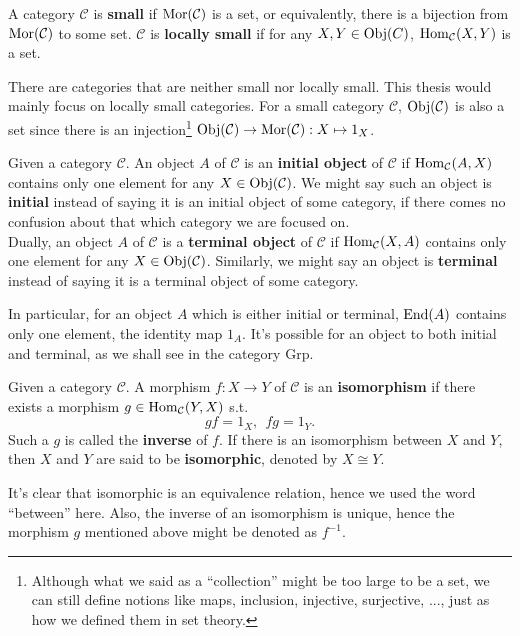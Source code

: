 	\begin{definition}
	A category $\mathcal{C}$ is \textbf{small} if $\operatorname{Mor}(\mathcal{C})$ is a set, or equivalently, there is a bijection from $\operatorname{Mor}(\mathcal{C})$ to some set. $\mathcal{C}$ is \textbf{locally small} if for any $X,Y\in \operatorname{Obj}(C)$, $\operatorname{Hom}_\mathcal{C}(X,Y)$ is a set.
	\end{definition}
There are categories that are neither small nor locally small. This thesis would mainly focus on locally small categories. For a small category $\mathcal{C}$, $\operatorname{Obj}(\mathcal{C})$ is also a set since there is an injection\footnote{Although what we said as a ``collection'' might be too large to be a set, we can still define notions like maps, inclusion, injective, surjective, ..., just as how we defined them in set theory.} $\operatorname{Obj}(\mathcal{C})\to\operatorname{Mor}(\mathcal{C}):X\mapsto 1_X$.
	\begin{definition}
	Given a category $\mathcal{C}$. An object $A$ of $\mathcal{C}$ is an \textbf{initial object} of $\mathcal{C}$ if $\operatorname{Hom}_\mathcal{C}(A,X)$ contains only one element for any $X\in \operatorname{Obj}(\mathcal{C})$. We might say such an object is \textbf{initial} instead of saying it is an initial object of some category, if there comes no confusion about that which category we are focused on. \\
	Dually, an object $A$ of $\mathcal{C}$ is a \textbf{terminal object} of $\mathcal{C}$ if $\operatorname{Hom}_\mathcal{C}(X,A)$ contains only one element for any $X\in \operatorname{Obj}(\mathcal{C})$. Similarly, we might say an object is \textbf{terminal} instead of saying it is a terminal object of some category.
	\end{definition}
In particular, for an object $A$ which is either initial or terminal, $\operatorname{End}(A)$ contains only one element, the identity map $1_A$. It's possible for an object to both initial and terminal, as we shall see in the category $\mathrm{Grp}$.
	\begin{definition}[Isomorphism]
	Given a category $\mathcal{C}$. A morphism $f:X\to Y$ of $\mathcal{C}$ is an \textbf{isomorphism} if there exists a morphism $g\in\operatorname{Hom}_\mathcal{C}(Y,X)$ s.t.
	\[gf=1_{X},\ \ fg=1_{Y}.\]
	Such a $g$ is called the \textbf{inverse} of $f$. If there is an isomorphism between $X$ and $Y$, then $X$ and $Y$ are said to be \textbf{isomorphic}, denoted by $X\cong Y$.
	\end{definition}
It's clear that isomorphic is an equivalence relation, hence we used the word ``between'' here. Also, the inverse of an isomorphism is unique, hence the morphism $g$ mentioned above might be denoted as $f^{-1}$.\par
